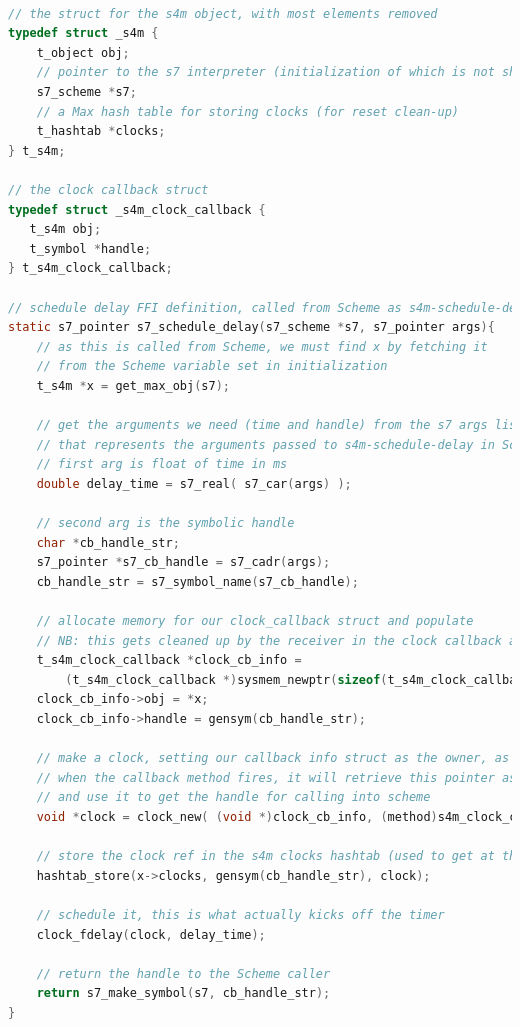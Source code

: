 \documentclass[acmsmall]{acmart}
\begin{document}
\begin{lstlisting}[language=C]

// the struct for the s4m object, with most elements removed
typedef struct _s4m {
    t_object obj;
    // pointer to the s7 interpreter (initialization of which is not shown)
    s7_scheme *s7;
    // a Max hash table for storing clocks (for reset clean-up)
    t_hashtab *clocks;     
} t_s4m;

// the clock callback struct
typedef struct _s4m_clock_callback {
   t_s4m obj;
   t_symbol *handle; 
} t_s4m_clock_callback;

// schedule delay FFI definition, called from Scheme as s4m-schedule-delay
static s7_pointer s7_schedule_delay(s7_scheme *s7, s7_pointer args){
    // as this is called from Scheme, we must find x by fetching it
    // from the Scheme variable set in initialization
    t_s4m *x = get_max_obj(s7);

    // get the arguments we need (time and handle) from the s7 args list
    // that represents the arguments passed to s4m-schedule-delay in Scheme
    // first arg is float of time in ms 
    double delay_time = s7_real( s7_car(args) );

    // second arg is the symbolic handle
    char *cb_handle_str;
    s7_pointer *s7_cb_handle = s7_cadr(args);
    cb_handle_str = s7_symbol_name(s7_cb_handle);

    // allocate memory for our clock_callback struct and populate
    // NB: this gets cleaned up by the receiver in the clock callback above
    t_s4m_clock_callback *clock_cb_info = 
        (t_s4m_clock_callback *)sysmem_newptr(sizeof(t_s4m_clock_callback));
    clock_cb_info->obj = *x;
    clock_cb_info->handle = gensym(cb_handle_str);

    // make a clock, setting our callback info struct as the owner, as a void pointer
    // when the callback method fires, it will retrieve this pointer as an arg 
    // and use it to get the handle for calling into scheme  
    void *clock = clock_new( (void *)clock_cb_info, (method)s4m_clock_callback);

    // store the clock ref in the s4m clocks hashtab (used to get at them for reset cancelling) 
    hashtab_store(x->clocks, gensym(cb_handle_str), clock); 

    // schedule it, this is what actually kicks off the timer
    clock_fdelay(clock, delay_time);

    // return the handle to the Scheme caller
    return s7_make_symbol(s7, cb_handle_str);
}


\end{lstlisting}
\end{document}
